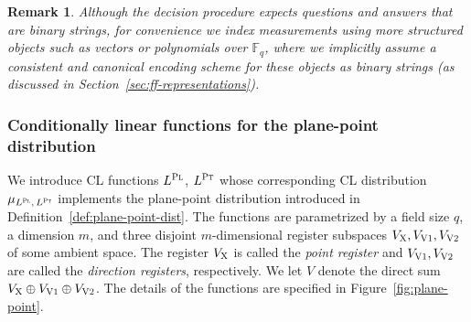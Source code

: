\documentclass[11pt]{article}
\newtheorem{remark}[theorem]{Remark}
\theoremstyle{definition}
\newcommand{\F}{\ensuremath{\mathbb{F}}}
\newcommand{\labelstyle}[1]{\ensuremath{\textsc{#1}}\xspace}
\newcommand{\xpt}{\labelstyle{X}}
\newcommand{\dir}[1]{\labelstyle{V#1}}
\newcommand{\plf}{\labelstyle{Pl}}
\newcommand{\ptf}{\labelstyle{Pt}}
\begin{document}
\begin{remark}
  \label{rmk:meas-labels}
  Although the decision procedure expects questions and answers that are binary
  strings, for convenience we index measurements using more structured objects
  such as vectors or polynomials over $\F_q$, where we implicitly assume a
  consistent and canonical encoding scheme for these objects as binary strings
  (as discussed in Section~\ref{sec:ff-representations}).
\end{remark}

\subsubsection{Conditionally linear functions for the plane-point distribution}
\label{sec:ld-cl-funcs}

We introduce CL functions $L^\plf$, $L^\ptf$ whose corresponding CL distribution
$\mu_{L^\plf,\, L^\ptf}$ implements the plane-point distribution introduced in
Definition~\ref{def:plane-point-dist}.
The functions are parametrized by a field size $q$, a dimension $m$, and three
disjoint $m$-dimensional register subspaces $V_\xpt,V_{\dir{1}},V_{\dir{2}}$ of
some ambient space.
The register $V_\xpt$ is called the \emph{point register} and
$V_{\dir{1}},V_{\dir{2}}$ are called the \emph{direction registers},
respectively.
We let $V$ denote the direct sum $V_\xpt \oplus V_{\dir{1}} \oplus V_{\dir{2}}$.
The details of the functions are specified in Figure~\ref{fig:plane-point}.
\end{document}
